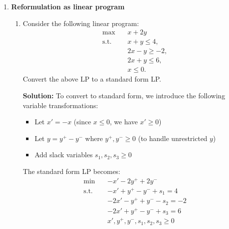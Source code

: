 \documentclass[11pt]{article}
\begin{document}
\begin{enumerate}
\begin{enumerate}
    Therefore, the unit hypercube provides the desired example of a polytope in dimension $n$ with exactly $2n$ inequalities where removing any inequality results in an unbounded polyhedron.
    
    By the way, an interesting fact is that examples of the above kind do not occur if the number of inequalities is more than $2n$. For example if a polytope is in dimension $n$ and is defined by $2n +1$ inequalities, then there always exists one inequality such that removing this inequality leaves the resulting (possibly larger) polyhedron bounded. I encourage you to experiment in $n =2$ dimension to see this fact!

    
\end{enumerate}

\item \textbf{Reformulation as linear program}
\begin{enumerate}
    \item Consider the following linear program:
\begin{align*}
    \max \quad & x + 2y \\
    \text{s.t.}\quad & x + y \le 4,\\
    & 2x - y \ge -2,\\
    & 2x + y \le 6, \\
    & x \le 0.
\end{align*}
Convert the above LP to a standard form LP.

    \textbf{Solution:}
    To convert to standard form, we introduce the following variable transformations:
    \begin{itemize}
        \item Let $x' = -x$ (since $x \leq 0$, we have $x' \geq 0$)
        \item Let $y = y^+ - y^-$ where $y^+, y^- \geq 0$ (to handle unrestricted $y$)
        \item Add slack variables $s_1, s_2, s_3 \geq 0$
    \end{itemize}
    
    The standard form LP becomes:
    \begin{align*}
    \min \quad & -x' - 2y^+ + 2y^- \\
    \text{s.t.}\quad & -x' + y^+ - y^- + s_1 = 4 \\
    & -2x' - y^+ + y^- - s_2 = -2 \\
    & -2x' + y^+ - y^- + s_3 = 6 \\
    & x', y^+, y^-, s_1, s_2, s_3 \geq 0
    \end{align*}


\end{enumerate}
\end{enumerate}
\end{document}
